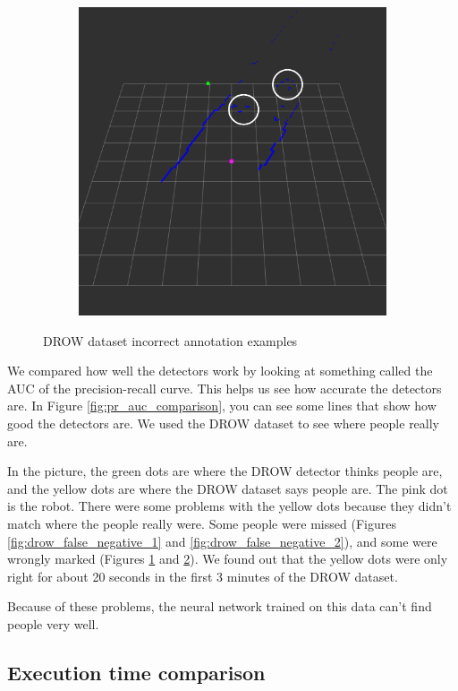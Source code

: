 \documentclass{article}
\begin{document}
\begin{figure}[t]
\begin{subfigure}{.5\textwidth}
		\caption{}
		\label{fig:drow_false_positive_1}
	\end{subfigure}%
	\begin{subfigure}{.5\linewidth}
		\centering
		\includegraphics[width=.65\linewidth, height=.65\linewidth]{ftd_false_positive_2}
		\caption{}
		\label{fig:drow_false_positive_2}
	\end{subfigure}
	\caption{DROW dataset incorrect annotation examples}
	\label{fig:drow_annotation_errors}
\end{figure}

We compared how well the detectors work by looking at something called the AUC of the precision-recall curve.
This helps us see how accurate the detectors are.
In Figure \ref{fig:pr_auc_comparison}, you can see some lines that show how good the detectors are.
We used the DROW dataset to see where people really are.

In the picture, the green dots are where the DROW detector thinks people are, and the yellow dots are where the DROW dataset says people are.
The pink dot is the robot.
There were some problems with the yellow dots because they didn't match where the people really were.
Some people were missed (Figures \ref{fig:drow_false_negative_1} and \ref{fig:drow_false_negative_2}), and some were wrongly marked (Figures \ref{fig:drow_false_positive_1} and \ref{fig:drow_false_positive_2}).
We found out that the yellow dots were only right for about 20 seconds in the first 3 minutes of the DROW dataset.

Because of these problems, the neural network trained on this data can't find people very well.

\subsection{Execution time comparison}
\end{document}
